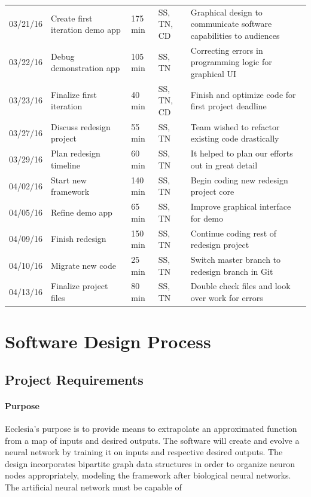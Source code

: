 \documentclass[letterpaper, 10pt]{article}
\begin{document}
\begin{center}
\begin{tabular} { l || p{1.25 in}| l| l|p{2.50in}}
		03/21/16 	& Create first iteration demo app			& 175 min	& SS, TN, CD	& Graphical design to communicate software capabilities to audiences \\
		03/22/16 	& Debug demonstration app 				& 105 min	& SS, TN 		& Correcting errors in programming logic for graphical UI \\
		03/23/16 	& Finalize first iteration 					& 40 min 	& SS, TN, CD	& Finish and optimize code for first project deadline \\
		03/27/16 	& Discuss redesign project 				& 55 min	& SS, TN 		& Team wished to refactor existing code drastically \\
		03/29/16 	& Plan redesign timeline					& 60 min	& SS, TN 		& It helped to plan our efforts out in great detail \\
		04/02/16 	& Start new framework 					& 140 min	& SS, TN 		& Begin coding new redesign project core \\
		04/05/16 	& Refine demo app						& 65 min	& SS, TN 		& Improve graphical interface for demo \\
		04/09/16 	& Finish redesign		 				& 150 min	& SS, TN 		& Continue coding rest of redesign project\\
		04/10/16 	& Migrate new code						& 25 min	& SS, TN 		& Switch master branch to redesign branch in Git \\
		04/13/16 	& Finalize project files					& 80 min	& SS, TN 		& Double check files and look over work for errors\\
		
	\end{tabular}
	\end{center}
	
	\normalsize
	
\cleardoublepage
\section{Software Design Process}
	\subsection{Project Requirements}
		\paragraph{Purpose}
		Ecclesia's purpose is to provide means to extrapolate an approximated function from a map of inputs and desired outputs. The software will create and evolve a neural network by training it on inputs and respective desired outputs. The design incorporates bipartite graph data structures in order to organize neuron nodes appropriately, modeling the framework after biological neural networks. The artificial neural network must be capable of 
\end{document}
